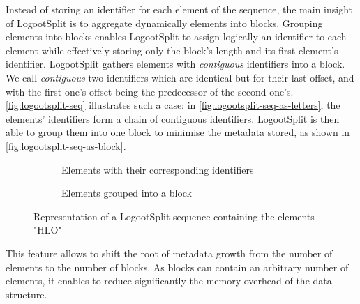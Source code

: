 \documentclass[sigplan,10pt]{acmart}
\newcommand{\trm}[1]{\mathit{#1}}
\newcommand{\id}[3]{$\trm{#1}^{\trm{#2}}_{\trm{#3}}$}
\newcommand{\widthletter}{7mm}
\begin{document}
Instead of storing an identifier for each element of the sequence, the main insight of LogootSplit is to aggregate dynamically elements into blocks.
Grouping elements into blocks enables LogootSplit to assign logically an identifier to each element while effectively storing only the block's length and its first element's identifier.
LogootSplit gathers elements with \emph{contiguous} identifiers into a block.
We call \emph{contiguous} two identifiers which are identical but for their last offset, and with the first one’s offset being the predecessor of the second one's.
\autoref{fig:logootsplit-seq} illustrates such a case: in \autoref{fig:logootsplit-seq-as-letters}, the elements' identifiers form a chain of contiguous identifiers.
LogootSplit is then able to group them into one block to minimise the metadata stored, as shown in \autoref{fig:logootsplit-seq-as-block}.

\begin{figure}[ht!]
    \begin{subfigure}{0.45\columnwidth}
        \centering
        \caption{Elements with their corresponding identifiers}
        \label{fig:logootsplit-seq-as-letters}
    \end{subfigure}
    \begin{subfigure}{0.45\columnwidth}
        \centering
        \caption{Elements grouped into a block}
        \label{fig:logootsplit-seq-as-block}
    \end{subfigure}
    \caption{Representation of a LogootSplit sequence containing the elements "HLO"}
    \label{fig:logootsplit-seq}
\end{figure}

This feature allows to shift the root of metadata growth from the number of elements to the number of blocks.
As blocks can contain an arbitrary number of elements, it enables to reduce significantly the memory overhead of the data structure.
\end{document}
